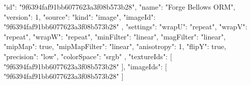 {
  "id": "9f6394faf91bb6077623a3f08b573b28",
  "name": "Forge Bellows ORM",
  "version": 1,
  "source": {
    "kind": "image",
    "imageId": "9f6394faf91bb6077623a3f08b573b28"
  },
  "settings": {
    "wrapU": "repeat",
    "wrapV": "repeat",
    "wrapW": "repeat",
    "minFilter": "linear",
    "magFilter": "linear",
    "mipMap": true,
    "mipMapFilter": "linear",
    "anisotropy": 1,
    "flipY": true,
    "precision": "low",
    "colorSpace": "srgb"
  },
  "textureIds": [
    "9f6394faf91bb6077623a3f08b573b28"
  ],
  "imageIds": [
    "9f6394faf91bb6077623a3f08b573b28"
  ]
}

